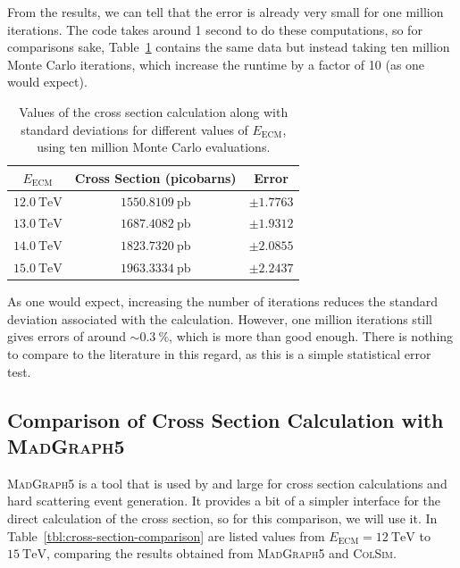 From the results, we can tell that the error is already very small for one million iterations. The code takes around 1 second to do these computations, so for comparisons sake, Table~\ref{tbl:cross-section-error2} contains the same data but instead taking ten million Monte Carlo iterations, which increase the runtime by a factor of 10 (as one would expect).


\begin{table}[h]
  \centering
  
  \begin{tabular}{|c|c|c|}
    \hline
    $E_{\mathrm{ECM}}$ & Cross Section (picobarns) & Error \\ \hline
    $\qty{12.0}{\tera\electronvolt}$ & $\qty{1550.8109}{\pico\barn}$ & $\pm 1.7763$ \\ \hline
    $\qty{13.0}{\tera\electronvolt}$ & $\qty{1687.4082}{\pico\barn}$ & $\pm 1.9312$ \\ \hline
    $\qty{14.0}{\tera\electronvolt}$ & $\qty{1823.7320}{\pico\barn}$ & $\pm 2.0855$ \\ \hline
    $\qty{15.0}{\tera\electronvolt}$ & $\qty{1963.3334}{\pico\barn}$ & $\pm 2.2437$ \\ \hline
  \end{tabular}
  \caption{Values of the cross section calculation along with standard deviations for different values of $E_{\mathrm{ECM}}$, using ten million Monte Carlo evaluations.}
  \label{tbl:cross-section-error2}
\end{table}

As one would expect, increasing the number of iterations reduces the standard deviation associated with the calculation. However, one million iterations still gives errors of around $\sim\qty{0.3}{\percent}$, which is more than good enough. There is nothing to compare to the literature in this regard, as this is a simple statistical error test.

\subsection{Comparison of Cross Section Calculation with \texorpdfstring{\textsc{MadGraph5}}{MadGraph5}}

\textsc{MadGraph5} is a tool that is used by and large for cross section calculations and hard scattering event generation. It provides a bit of a simpler interface for the direct calculation of the cross section, so for this comparison, we will use it. In Table~\ref{tbl:cross-section-comparison} are listed values from $E_{\mathrm{ECM}} = \qty{12}{\tera\electronvolt}$ to $\qty{15}{\tera\electronvolt}$, comparing the results obtained from \textsc{MadGraph5} and \textsc{ColSim}.

